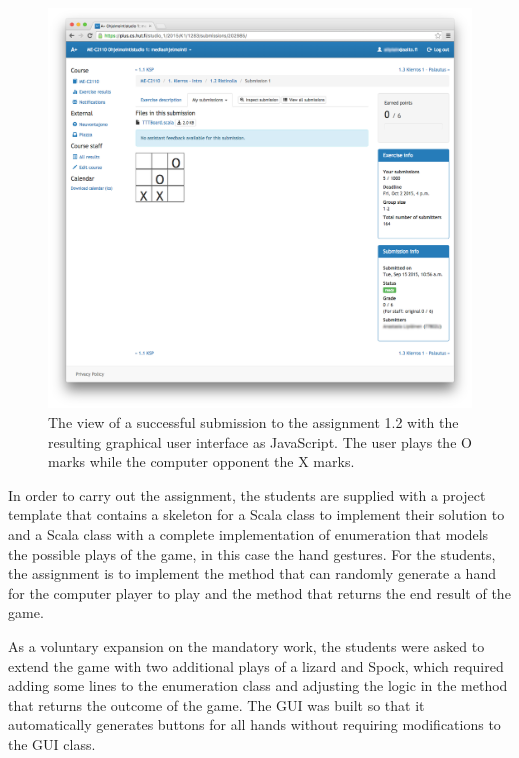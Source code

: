 \begin{figure}[!hb]
	\begin{center}
		\includegraphics[width=\textwidth]{images/assignment1_2-mod.png}
	\end{center}
	\caption[asdf]{\small{The view of a successful submission to the assignment 1.2 with the resulting graphical user interface as JavaScript. The user plays the O marks while the computer opponent the X marks.}}
	\label{figure:assignment1_2}
\end{figure}

In order to carry out the assignment, the students are supplied with a project template that contains a skeleton for a Scala class to implement their solution to and a Scala class with a complete implementation of enumeration that models the possible plays of the game, in this case the hand gestures. For the students, the assignment is to implement the method that can randomly generate a hand for the computer player to play and the method that returns the end result of the game.

As a voluntary expansion on the mandatory work, the students were asked to extend the game with two additional plays of a lizard and Spock, which required adding some lines to the enumeration class and adjusting the logic in the method that returns the outcome of the game. The GUI was built so that it automatically generates buttons for all hands without requiring modifications to the GUI class.

